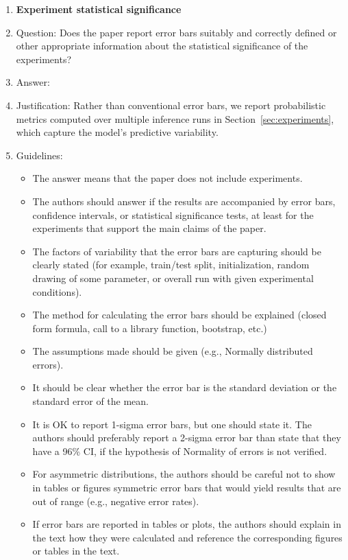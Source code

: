 \documentclass{article}
\begin{document}
\begin{enumerate}
\item {\bf Experiment statistical significance}
    \item[] Question: Does the paper report error bars suitably and correctly defined or other appropriate information about the statistical significance of the experiments?
    \item[] Answer: \answerYes{} %
    \item[] Justification: Rather than conventional error bars, we report probabilistic metrics computed over multiple inference runs in Section~\ref{sec:experiments}, which capture the model’s predictive variability.
    \item[] Guidelines:
    \begin{itemize}
        \item The answer \answerNA{} means that the paper does not include experiments.
        \item The authors should answer \answerYes{} if the results are accompanied by error bars, confidence intervals, or statistical significance tests, at least for the experiments that support the main claims of the paper.
        \item The factors of variability that the error bars are capturing should be clearly stated (for example, train/test split, initialization, random drawing of some parameter, or overall run with given experimental conditions).
        \item The method for calculating the error bars should be explained (closed form formula, call to a library function, bootstrap, etc.)
        \item The assumptions made should be given (e.g., Normally distributed errors).
        \item It should be clear whether the error bar is the standard deviation or the standard error of the mean.
        \item It is OK to report 1-sigma error bars, but one should state it. The authors should preferably report a 2-sigma error bar than state that they have a 96\% CI, if the hypothesis of Normality of errors is not verified.
        \item For asymmetric distributions, the authors should be careful not to show in tables or figures symmetric error bars that would yield results that are out of range (e.g., negative error rates).
        \item If error bars are reported in tables or plots, the authors should explain in the text how they were calculated and reference the corresponding figures or tables in the text.
    \end{itemize}


\end{enumerate}
\end{document}
